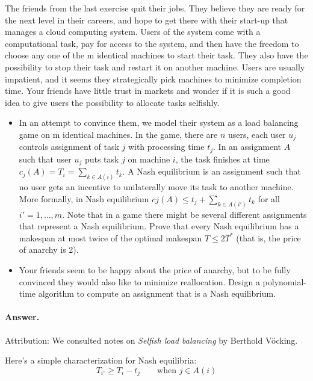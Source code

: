 \documentclass[a4paper]{article}
\begin{document}
The friends from the last exercise quit their jobs. They believe they are ready for the next level in their careers, and hope to get there with their start-up that manages a cloud computing system. Users of the system come with a computational task, pay for access to the system, and then have the freedom to choose any one of the m identical machines to start their task. They also have the possibility to stop their task and restart it on another machine. Users are usually impatient, and it seems they strategically pick machines to minimize completion time. Your friends have little trust in markets and wonder if it is such a good idea to give users the possibility to allocate tasks selfishly.
\begin{itemize}
	\item In an attempt to convince them, we model their system as a load balancing game on m identical machines. In the game, there are $n$ users, each user $u_j$ controls assignment of task $j$ with processing time $t_j$. In an assignment $A$ such that user $u_j$ puts task $j$ on machine $i$, the task finishes at time $c_j(A) = T_i = \sum_{k \in A(i)} t_k$. A Nash equilibrium is an assignment such that no user gets an incentive to unilaterally move its task to another machine. More formally, in Nash equilibrium $cj(A) \le t_j + \sum_{k \in A(i′)} t_k$ for all $i′ = 1,\ldots,m$. Note that in a game there might be several different assignments that represent a Nash equilibrium. Prove that every Nash equilibrium has a makespan at most twice of the optimal makespan $T \le 2T^\ast$ (that is, the price of anarchy is 2).
	\item Your friends seem to be happy about the price of anarchy, but to be fully convinced they would also like to minimize reallocation. Design a polynomial-time algorithm to compute an assignment that is a Nash equilibrium.

\end{itemize}

\paragraph{Answer.}
Attribution: We consulted notes on \emph{Selfish load balancing} by Berthold V\"ocking.

Here's a simple characterization for Nash equilibria:
\begin{equation}\label{eq:nash}
	T_{i'} \ge T_i - t_j	\qquad \text{when $j \in A(i)$}
\end{equation}
\end{document}
